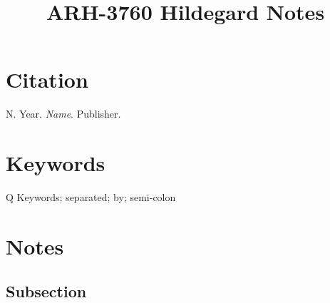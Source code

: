 \documentclass{article}
\title{ARH-3760 Hildegard Notes}
\begin{document}
\maketitle

\section{Citation}
N. Year. \textit{Name}. Publisher.

\section{Keywords}Q
Keywords; separated; by; semi-colon

\section{Notes}

\subsection{Subsection}
\end{document}
